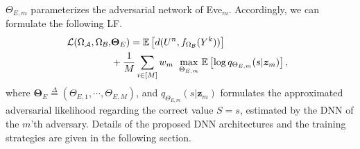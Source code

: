 \documentclass[conference]{IEEEtran}
\begin{document}
	$\Theta_{E,m}$  parameterizes  the adversarial network of Eve$_{m}$. 
	Accordingly, we can formulate the following  LF.   
	\begin{align}\label{eq:P-DL}
		\hspace{-2mm} \mathcal{L}(\Omega_{\cal A},\Omega_{\cal B},&\mathbf{\Theta}_E)     = 
	   \mathbb{E}\left[d(U^n,f_{\Omega_{\cal B}}(Y^k))\right]  \nonumber
		 \\ 
		& + 
		\frac{1}{M}	\hspace{0mm} \sum_{i \in [M]} w_m \hspace{2mm} \underset{\Theta_{E,m}}{\text{max}}
		\hspace{1mm}
		\mathbb{E}\left[\log q_{\Theta_{E,m}}({s|{\boldsymbol z}_m})\right],  
	\end{align}
	where  $\mathbf{\Theta}_E \overset{\Delta}{=} (\Theta_{E,1}, \cdots,\Theta_{E,M})$, 
	and $q_{\Theta_{E,m}}({s|{\boldsymbol z}_m})$ formulates the approximated adversarial   likelihood regarding  the correct value $S=s$, 
	estimated  by the DNN of the  $m$'th adversary. 
	Details of the 
	proposed DNN architectures and the training strategies  are given in the following  section. 

	 
 

	
	
	
	
	\vspace{-0mm}
\end{document}

